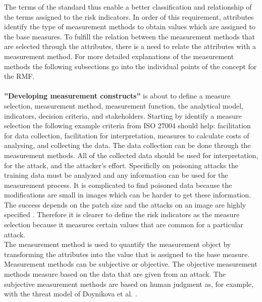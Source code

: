 The terms of the standard thus enable a better classification and relationship of the terms assigned to the risk indicators. In order of this requirement, attributes identify the type of measurement methods to obtain values which are assigned to the base measures. To fulfill the relation between the measurement methods that are selected through the attributes, there is a need to relate the attributes with a measurement method. For more detailed explanations of the measurement methods the following subsections go into the individual points of the concept for the RMF. \\ \\

\textbf{''Developing measurement constructs''} is about to define a measure selection, measurement method, measurement function, the analytical model, indicators, decision criteria, and stakeholders. Starting by identify a measure selection the following example criteria from ISO 27004 should help: facilitation for data collection, facilitation for interpretation, measures to calculate costs of analysing, and collecting the data. The data collection can be done through the measurement methods. All of the collected data should be used for interpretation, for the attack, and the attacker's effort. Specificlly on poisoning attacks the training data must be analyzed and any information can be used for the measurement process. It is complicated to find poisoned data because the modifications are small in images which can be harder to get these information. The success depends on the patch size and the attacks on an image are highly specified \cite{DBLP:conf/icml/SchwarzschildGG21}. Therefore it is clearer to define the risk indicators as the measure selection because it measures certain values that are common for a particular attack. \\ The measurement method is used to quantify the measurement object by transforming the attributes into the value that is assigned to the base measure. Measurement methods can be subjective or objective. The objective measurement methods measure based on the data that are given from an attack. The subjective measurement methods are based on human judgment as, for example, with the threat model of Doynikova et al. \cite{DBLP:conf/crisis/DoynikovaNGK20}.

